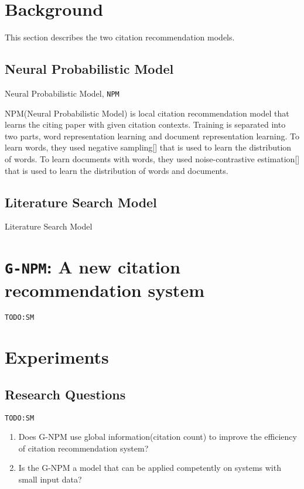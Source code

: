 \documentclass{llncs}
\newcommand{\name}{\texttt{G-NPM}\xspace}
\newcommand{\npm}{\texttt{NPM}\xspace}
\newcommand{\todo}[1]{\texttt{\color{red}TODO:#1}}
\begin{document}
\section{Background}
This section describes the two citation recommendation models.

\subsection{Neural Probabilistic Model}
Neural Probabilistic Model, \npm ~\cite{Huang:2015:NPM:2886521.2886655}

NPM(Neural Probabilistic Model) is local citation recommendation model that learns the citing paper with given citation contexts. Training is separated into two parts, word representation learning and document representation learning. To learn words, they used negative sampling[] that is used to learn the distribution of words. To learn documents with words, they used noise-contrastive estimation[] that is used to learn the distribution of words and documents.

\subsection{Literature Search Model}
Literature Search Model~\cite{Bethard:2010:ICL:1871437.1871517}

\section{\name: A new citation recommendation system}
\todo{SM}


\section{Experiments}
\subsection{Research Questions}
\todo{SM}

\begin{enumerate}
\item Does G-NPM use global information(citation count) to improve the efficiency of citation recommendation system?
\item Is the G-NPM a model that can be applied competently on systems with small input data?
\end{enumerate}
\end{document}
